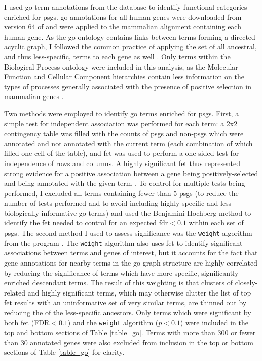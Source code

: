 I used \ac{go} term annotations from the \ens database to identify
functional categories enriched for \acp{psg}. \ac{go} annotations for
all human genes were downloaded from version 64 of \ens and were
applied to the mammalian alignment containing each human gene. As the
\ac{go} ontology contains links between terms forming a directed
acyclic graph, I followed the common practice of applying the set of
all ancestral, and thus less-specific, terms to each gene as well
\citep{Rivals2007}. Only terms within the Biological Process ontology
were included in this analysis, as the Molecular Function and Cellular
Component hierarchies contain less information on the types of
processes generally associated with the presence of positive selection
in mammalian genes \citep{Macaque2007}.

Two methods were employed to identify \ac{go} terms enriched for
\acp{psg}. First, a simple test for independent association was
performed for each term: a 2x2 contingency table was filled with the
counts of \acp{psg} and non-\acp{psg} which were annotated and not
annotated with the current term (each combination of which filled one
cell of the table), and \ac{fet} was used to perform a one-sided test
for independence of rows and columns. A highly significant \ac{fet}
\pv thus represented strong evidence for a positive association
between a gene being positively-selected and being annotated with the
given term \citep{Rivals2007}. To control for multiple tests being
performed, I excluded all terms containing fewer than 5 \acp{psg} (to
reduce the number of tests performed and to avoid including highly
specific and less biologically-informative \ac{go} terms) and used the
Benjamini-Hochberg method to identify the \ac{fet} \pv needed to
control for an expected \ac{fdr}$<0.1$ within each set of
\acp{psg}. The second method I used to assess significance was the
\texttt{weight} algorithm from the \topgo program
\citep{Alexa2006a}. The \texttt{weight} algorithm also uses \ac{fet}
to identify significant associations between terms and genes of
interest, but it accounts for the fact that gene annotations for
nearby terms in the \ac{go} graph structure are highly correlated by
reducing the significance of terms which have more specific,
significantly-enriched descendant terms. The result of this weighting
is that clusters of closely-related and highly significant terms,
which may otherwise clutter the list of top \ac{fet} results with an
uninformative set of very similar terms, are thinned out by reducing
the \pvs of the less-specific ancestors. Only terms which were
significant by both \ac{fet} (FDR$<0.1$) and the \texttt{weight}
algorithm ($p<0.1$) were included in the top and bottom sections of
Table \ref{table_go}. Terms with more than 300 or fewer than 30
annotated genes were also excluded from inclusion in the top or bottom
sections of Table \ref{table_go} for clarity.

